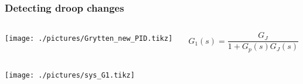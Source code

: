 \begin{frame}
	\frametitle{Detecting droop changes}
	\begin{columns}
		\begin{column}{0.65\textwidth}
			\texttt{[image: ./pictures/Grytten\_new\_PID.tikz]}
		\end{column}
		\begin{column}{0.35\textwidth}
			\begin{equation*}
				G_1(s) = \frac{G_{J}}{1+G_p(s)G_J(s)}
			\end{equation*}
		\end{column}
	\end{columns}
	\texttt{[image: ./pictures/sys\_G1.tikz]}
\end{frame}	
